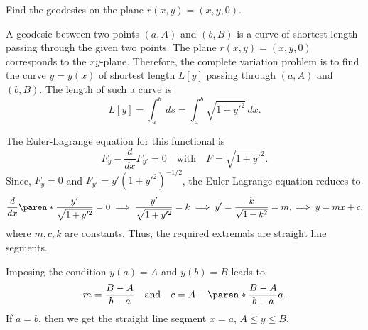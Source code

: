 \documentclass[11pt]{penrose}
\begin{document}
\begin{problem}{3}
    Find the geodesics on the plane $r(x,y) = (x,y,0)$.

    \solution A geodesic between two points $(a, A)$ and $(b, B)$ is a curve of shortest length passing through the given two points. The plane $r(x,y) = (x,y,0)$ corresponds to the $xy$-plane. Therefore, the complete variation problem is to find the curve $y = y(x)$ of shortest length $L[y]$ passing through $(a, A)$ and $(b, B)$. The length of such a curve is
    \begin{equation*}
        L[y] = \int_a^b \,ds
        = \int_a^b \sqrt{1 + y'^2} \,dx.
    \end{equation*}

    The Euler-Lagrange equation for this functional is
    \begin{equation*}
        F_{y} - \frac{d}{dx}F_{y'} = 0 \quad\text{with}\quad F = \sqrt{1 + y'^2}.
    \end{equation*}
    Since, $F_{y} = 0$ and $F_{y'} = y' (1 + y'^2)^{-1/2}$, the Euler-Lagrange equation reduces to
    \begin{equation*}
        \frac{d}{dx}\paren*{\frac{y'}{\sqrt{1 + y'^2}}} = 0
        \implies
        \frac{y'}{\sqrt{1 + y'^2}} = k
        \implies
        y' = \frac{k}{\sqrt{1 - k^2}} = m,
        \implies
        y = m x + c,
    \end{equation*}
    where $m, c, k$ are constants. Thus, the required extremals are straight line segments.

    Imposing the condition $y(a) = A$ and $y(b) = B$ leads to
    \begin{equation*}
        m = \frac{B - A}{b - a}
        \quad\text{and}\quad
        c = A - \paren*{\frac{B - A}{b - a}}a.
    \end{equation*}
    If $a = b$, then we get the straight line segment $x = a$, $A \leq y \leq B$.
\end{problem}
\end{document}
